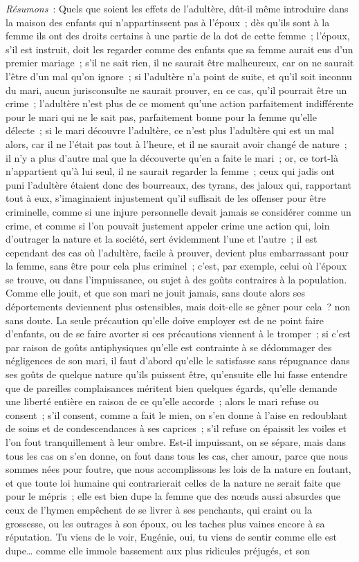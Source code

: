 \documentclass[french,twoside]{book} %
\begin{document}
{\itshape Résumons} : Quels que soient les effets de l’adultère, dût-il même introduire dans la maison des enfants qui n’appartinssent pas à l’époux ; dès qu’ils sont à la femme ils ont des droits certains à une partie de la dot de cette femme ; l’époux, s’il est instruit, doit les regarder comme des enfants que sa femme aurait eus d’un premier mariage ; s’il ne sait rien, il ne saurait être malheureux, car on ne saurait l’être d’un mal qu’on ignore ; si l’adultère n’a point de suite, et qu’il soit inconnu du mari, aucun jurisconsulte ne saurait prouver, en ce cas, qu’il pourrait être un crime ; l’adultère n’est plus de ce moment qu’une action parfaitement indifférente pour le mari qui ne le sait pas, parfaitement bonne pour la femme qu’elle délecte ; si le mari découvre l’adultère, ce n’est plus l’adultère qui est un mal alors, car il ne l’était pas tout à l’heure, et il ne saurait avoir changé de nature ; il n’y a plus d’autre mal que la découverte qu’en a faite le mari ; or, ce tort-là n’appartient qu’à lui seul, il ne saurait regarder la femme ; ceux qui jadis ont puni l’adultère étaient donc des bourreaux, des tyrans, des jaloux qui, rapportant tout à eux, s’imaginaient injustement qu’il suffisait de les offenser pour être criminelle, comme si une injure personnelle devait jamais se considérer comme un crime, et comme si l’on pouvait justement appeler crime une action qui, loin d’outrager la nature et la société, sert évidemment l’une et l’autre ; il est cependant des cas où l’adultère, facile à prouver, devient plus embarrassant pour la femme, sans être pour cela plus criminel ; c’est, par exemple, celui où l’époux se trouve, ou dans l’impuissance, ou sujet à des goûts contraires à la population. Comme elle jouit, et que son mari ne jouit jamais, sans doute alors ses déportements deviennent plus ostensibles, mais doit-elle se gêner pour cela ? non sans doute. La seule précaution qu’elle doive employer est de ne point faire d’enfants, ou de se faire avorter si ces précautions viennent à le tromper ; si c’est par raison de goûts antiphysiques qu’elle est contrainte à se dédommager des négligences de son mari, il faut d’abord qu’elle le satisfasse sans répugnance dans ses goûts de quelque nature qu’ils puissent être, qu’ensuite elle lui fasse entendre que de pareilles complaisances méritent bien quelques égards, qu’elle demande une liberté entière en raison de ce qu’elle accorde ; alors le mari refuse ou consent ; s’il consent, comme a fait le mien, on s’en donne à l’aise en redoublant de soins et de condescendances à ses caprices ; s’il refuse on épaissit les voiles et l’on fout tranquillement à leur ombre. Est-il impuissant, on se sépare, mais dans tous les cas on s’en donne, on fout dans tous les cas, cher amour, parce que nous sommes nées pour foutre, que nous accomplissons les lois de la nature en foutant, et que toute loi humaine qui contrarierait celles de la nature ne serait faite que pour le mépris ; elle est bien dupe la femme que des nœuds aussi absurdes que ceux de l’hymen empêchent de se livrer à ses penchants, qui craint ou la grossesse, ou les outrages à son époux, ou les taches plus vaines encore à sa réputation. Tu viens de le voir, Eugénie, oui, tu viens de sentir comme elle est dupe… comme elle immole bassement aux plus ridicules préjugés, et son 
\end{document}
